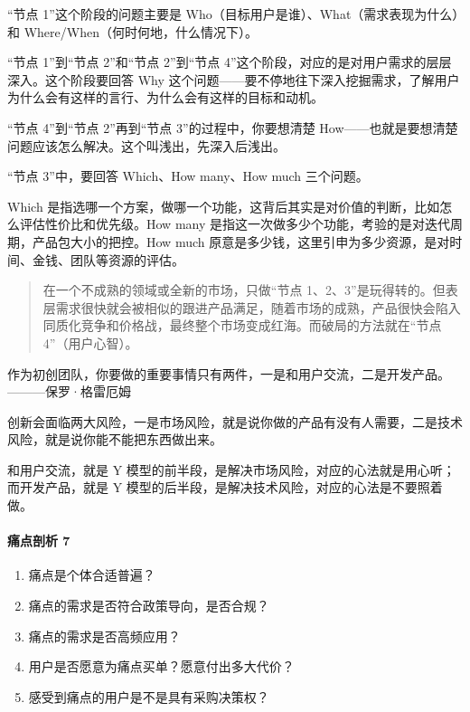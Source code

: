 \documentclass[letterpaper,10pt,english]{sphinxmanual}
\begin{document}
“节点 1”这个阶段的问题主要是
Who（目标用户是谁）、What（需求表现为什么）和
Where/When（何时何地，什么情况下）。

“节点 1”到“节点 2”和“节点 2”到“节点
4”这个阶段，对应的是对用户需求的层层深入。这个阶段要回答 Why
这个问题——要不停地往下深入挖掘需求，了解用户为什么会有这样的言行、为什么会有这样的目标和动机。

“节点 4”到“节点 2”再到“节点 3”的过程中，你要想清楚
How——也就是要想清楚问题应该怎么解决。这个叫浅出，先深入后浅出。

“节点 3”中，要回答 Which、How many、How much 三个问题。

Which
是指选哪一个方案，做哪一个功能，这背后其实是对价值的判断，比如怎么评估性价比和优先级。How
many 是指这一次做多少个功能，考验的是对迭代周期，产品包大小的把控。How
much
原意是多少钱，这里引申为多少资源，是对时间、金钱、团队等资源的评估。
\begin{quote}

在一个不成熟的领域或全新的市场，只做“节点
1、2、3”是玩得转的。但表层需求很快就会被相似的跟进产品满足，随着市场的成熟，产品很快会陷入同质化竞争和价格战，最终整个市场变成红海。而破局的方法就在“节点
4”（用户心智）。
\end{quote}

作为初创团队，你要做的重要事情只有两件，一是和用户交流，二是开发产品。
———保罗·格雷厄姆

创新会面临两大风险，一是市场风险，就是说你做的产品有没有人需要，二是技术风险，就是说你能不能把东西做出来。

和用户交流，就是 Y
模型的前半段，是解决市场风险，对应的心法就是用心听；而开发产品，就是 Y
模型的后半段，是解决技术风险，对应的心法是不要照着做。


\paragraph{痛点剖析 7\sphinxfootnotemark[542]}
\label{\detokenize{chapter_knowledge/demand_analysis:id6}}%
\begin{footnotetext}[542]\sphinxAtStartFootnote
{}
%
\end{footnotetext}\ignorespaces \begin{enumerate}
%
\item {} 
痛点是个体合适普遍？

\item {} 
痛点的需求是否符合政策导向，是否合规？

\item {} 
痛点的需求是否高频应用？

\item {} 
用户是否愿意为痛点买单？愿意付出多大代价？

\item {} 
感受到痛点的用户是不是具有采购决策权？

\end{enumerate}
\end{document}
